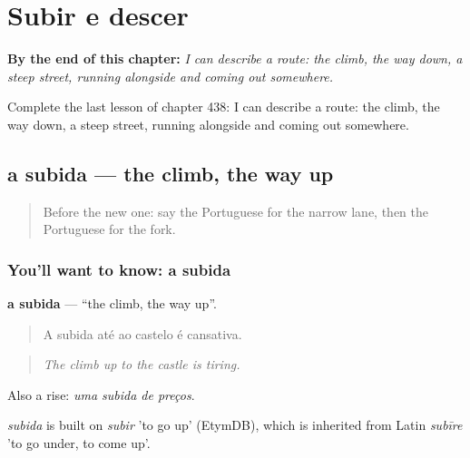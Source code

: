 
\chapter{Subir e descer}
\label{ch:pt-subir-e-descer}

\begin{chapteropening}
\textbf{By the end of this chapter:} \emph{I can describe a route: the climb, the way down, a steep street, running alongside and coming out somewhere.}

Complete the last lesson of chapter 438: I can describe a route: the climb, the way down, a steep street, running alongside and coming out somewhere.
\end{chapteropening}

\section[a subida]{a subida — the climb, the way up}

\label{lesson:PT-C438-subida}



\begin{quote}
Before the new one: say the Portuguese for the narrow lane, then the Portuguese for the fork.
\end{quote}

\subsection*{You'll want to know: a subida}
\textbf{a subida} — \textquotedblleft{}the climb, the way up\textquotedblright{}.

\begin{quote}
A subida até ao castelo é cansativa.
\end{quote}

\begin{quote}
\emph{The climb up to the castle is tiring.}
\end{quote}

Also a rise: \emph{uma subida de preços}.

\begin{cousinweb}
\emph{subida} is built on \emph{subir} 'to go up' (EtymDB), which is inherited from Latin \emph{subīre} 'to go under, to come up'.
\end{cousinweb}

